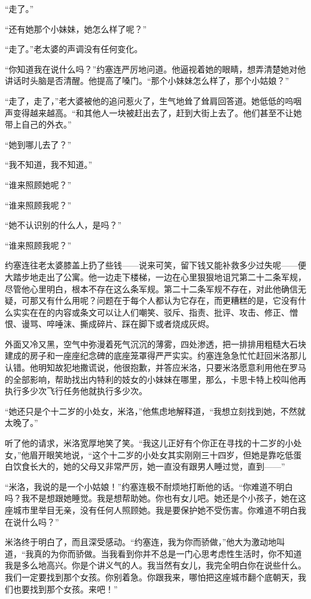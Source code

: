     “走了。”

    “还有她那个小妹妹，她怎么样了呢？”

    “走了。”老太婆的声调没有任何变化。

    “你知道我在说什么吗？”约塞连严厉地问道。他逼视着她的眼睛，想弄清楚她对他讲话时头脑是否清醒。他提高了嗓门。“那个小妹妹怎么样了，那个小姑娘？”

    “走了，走了，”老大婆被他的追问惹火了，生气地耸了耸肩回答道。她低低的呜咽声变得越来越高。“和其他人一块被赶出去了，赶到大街上去了。他们甚至不让她带上自己的外衣。”

    “她到哪儿去了？”

    “我不知道，我不知道。”

    “谁来照顾她呢？”

    “谁来照顾我呢？”

    “她不认识别的什么人，是吗？”

    “谁来照顾我呢？”

    约塞连往老太婆膝盖上扔了些钱——说来可笑，留下钱又能补救多少过失呢——便大踏步地走出了公寓。他一边走下楼梯，一边在心里狠狠地诅咒第二十二条军规，尽管他心里明白，根本不存在这么条军规。第二十二条军规不存在，对此他确信无疑，可那又有什么用呢？问题在于每个人都认为它存在，而更糟糕的是，它没有什么实实在在的内容或条文可以让人们嘲笑、驳斥、指责、批评、攻击、修正、憎恨、谩骂、啐唾沫、撕成碎片、踩在脚下或者烧成灰烬。

    外面又冷又黑，空气中弥漫着死气沉沉的薄雾，四处渗透，把一排排用粗糙大石块建成的房子和一座座纪念碑的底座笼罩得严严实实。约塞连急急忙忙赶回米洛那儿认错。他明知故犯地撒谎说，他很抱歉，并答应米洛，只要米洛愿意利用他在罗马的全部影响，帮助找出内特利的妓女的小妹妹在哪里，那么，卡思卡特上校叫他再执行多少次飞行任务他就执行多少次。

    “她还只是个十二岁的小处女，米洛，”他焦虑地解释道，“我想立刻找到她，不然就太晚了。”

    听了他的请求，米洛宽厚地笑了笑。“我这儿正好有个你正在寻找的十二岁的小处女，”他眉开眼笑地说，“这个十二岁的小处女其实刚刚三十四岁，但她是靠吃低蛋白饮食长大的，她的父母又非常严厉，她一直没有跟男人睡过觉，直到——”

    “米洛，我说的是一个小姑娘！”约塞连极不耐烦地打断他的话。“你难道不明白吗？我不是想跟她睡觉。我是想帮助她。你也有女儿吧。她还是个小孩子，她在这座城市里举目无亲，没有任何人照顾她。我是要保护她不受伤害。你难道不明白我在说什么吗？”
 


    米洛终于明白了，而且深受感动。“约塞连，我为你而骄做，”他大为激动地叫道，“我真的为你而骄做。当我看到你并不总是一门心思考虑性生活时，你不知道我是多么地高兴。你是个讲义气的人。我当然有女儿，我完全明白你在说些什么。我们一定要找到那个女孩。你别着急。你跟我来，哪怕把这座城市翻个底朝天，我们也要找到那个女孩。来吧！”

